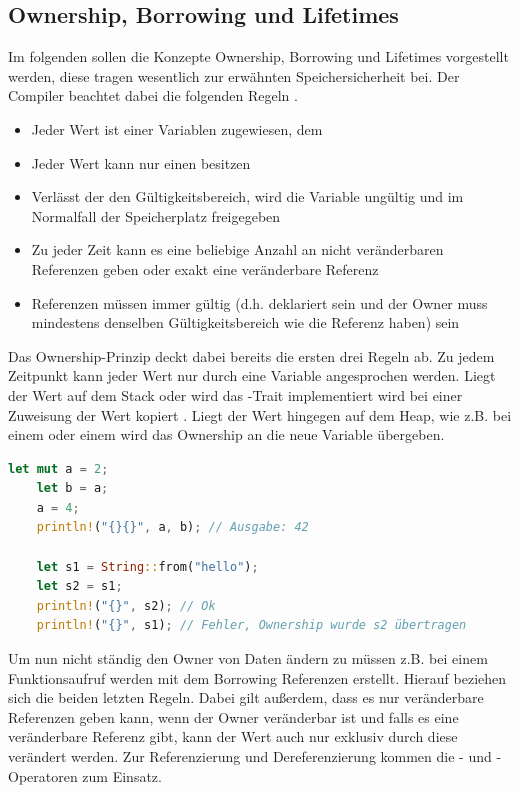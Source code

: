 \documentclass[11pt,a4paper, ngerman]{article}
\begin{document}
\subsection{Ownership, Borrowing und Lifetimes}
Im folgenden sollen die Konzepte Ownership, Borrowing und Lifetimes vorgestellt werden, diese tragen wesentlich zur erwähnten Speichersicherheit bei. Der Compiler beachtet dabei die folgenden Regeln \cite{Rules1} \cite{Rules2}.

\begin{itemize}
    \item Jeder Wert ist einer Variablen zugewiesen, dem 
    \item Jeder Wert kann nur einen  besitzen
    \item Verlässt der  den Gültigkeitsbereich, wird die Variable ungültig und im Normalfall der Speicherplatz freigegeben
    \item Zu jeder Zeit kann es eine beliebige Anzahl an nicht veränderbaren Referenzen geben oder exakt eine veränderbare Referenz
    \item Referenzen müssen immer gültig (d.h. deklariert sein und der Owner muss mindestens denselben Gültigkeitsbereich wie die Referenz haben) sein
\end{itemize}

Das Ownership-Prinzip deckt dabei bereits die ersten drei Regeln ab. Zu jedem Zeitpunkt kann jeder Wert nur durch eine Variable angesprochen werden. Liegt der Wert auf dem Stack oder wird das -Trait implementiert wird bei einer Zuweisung der Wert kopiert \cite{CopyTraitOwner}. Liegt der Wert hingegen auf dem Heap, wie z.B. bei einem  oder einem  wird das Ownership an die neue Variable übergeben.

\begin{lstlisting}[language=rust, caption={ownership}]
    let mut a = 2;
    let b = a;
    a = 4;
    println!("{}{}", a, b); // Ausgabe: 42

    let s1 = String::from("hello");
    let s2 = s1;
    println!("{}", s2); // Ok
    println!("{}", s1); // Fehler, Ownership wurde s2 übertragen
\end{lstlisting}

Um nun nicht ständig den Owner von Daten ändern zu müssen z.B. bei einem Funktionsaufruf werden mit dem Borrowing Referenzen erstellt. Hierauf beziehen sich die beiden letzten Regeln. Dabei gilt außerdem, dass es nur veränderbare Referenzen geben kann, wenn der Owner veränderbar ist und falls es eine veränderbare Referenz gibt, kann der Wert auch nur exklusiv durch diese verändert werden. Zur Referenzierung und Dereferenzierung kommen die \codeword{&}- und \codeword{*}-Operatoren zum Einsatz.
\end{document}
